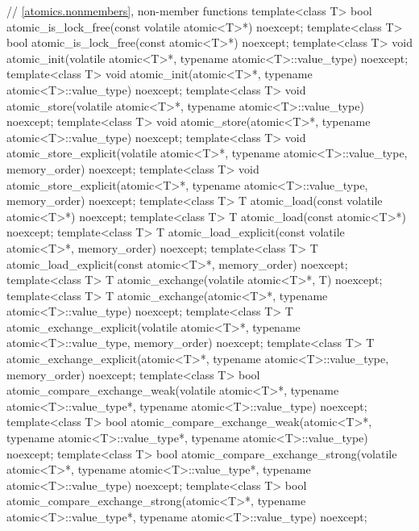 \begin{codeblock}
{  // \ref{atomics.nonmembers}, non-member functions
  template<class T>
    bool atomic_is_lock_free(const volatile atomic<T>*) noexcept;
  template<class T>
    bool atomic_is_lock_free(const atomic<T>*) noexcept;
  template<class T>
    void atomic_init(volatile atomic<T>*, typename atomic<T>::value_type) noexcept;
  template<class T>
    void atomic_init(atomic<T>*, typename atomic<T>::value_type) noexcept;
  template<class T>
    void atomic_store(volatile atomic<T>*, typename atomic<T>::value_type) noexcept;
  template<class T>
    void atomic_store(atomic<T>*, typename atomic<T>::value_type) noexcept;
  template<class T>
    void atomic_store_explicit(volatile atomic<T>*, typename atomic<T>::value_type,
                               memory_order) noexcept;
  template<class T>
    void atomic_store_explicit(atomic<T>*, typename atomic<T>::value_type,
                               memory_order) noexcept;
  template<class T>
    T atomic_load(const volatile atomic<T>*) noexcept;
  template<class T>
    T atomic_load(const atomic<T>*) noexcept;
  template<class T>
    T atomic_load_explicit(const volatile atomic<T>*, memory_order) noexcept;
  template<class T>
    T atomic_load_explicit(const atomic<T>*, memory_order) noexcept;
  template<class T>
    T atomic_exchange(volatile atomic<T>*, T) noexcept;
  template<class T>
    T atomic_exchange(atomic<T>*, typename atomic<T>::value_type) noexcept;
  template<class T>
    T atomic_exchange_explicit(volatile atomic<T>*, typename atomic<T>::value_type,
                               memory_order) noexcept;
  template<class T>
    T atomic_exchange_explicit(atomic<T>*, typename atomic<T>::value_type,
                               memory_order) noexcept;
  template<class T>
    bool atomic_compare_exchange_weak(volatile atomic<T>*,
                                      typename atomic<T>::value_type*,
                                      typename atomic<T>::value_type) noexcept;
  template<class T>
    bool atomic_compare_exchange_weak(atomic<T>*,
                                      typename atomic<T>::value_type*,
                                      typename atomic<T>::value_type) noexcept;
  template<class T>
    bool atomic_compare_exchange_strong(volatile atomic<T>*,
                                        typename atomic<T>::value_type*,
                                        typename atomic<T>::value_type) noexcept;
  template<class T>
    bool atomic_compare_exchange_strong(atomic<T>*,
                                        typename atomic<T>::value_type*,
                                        typename atomic<T>::value_type) noexcept;
}
\end{codeblock}
